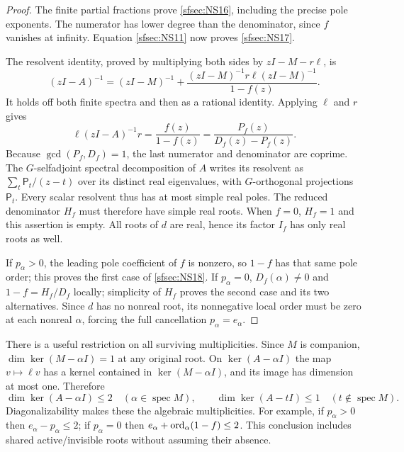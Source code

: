\begin{proof}
The finite partial fractions prove \eqref{sfsec:NS16}, including
the precise pole exponents. The numerator has lower degree
than the denominator, since $f$ vanishes at infinity.
Equation \eqref{sfsec:NS11} now proves \eqref{sfsec:NS17}.

The resolvent identity, proved by multiplying both sides
by $zI-M-r\ell$, is
\begin{equation}\tag{NS19}\label{sfsec:NS19}
(zI-A)^{-1}
=(zI-M)^{-1}
 +\frac{(zI-M)^{-1}r\ell(zI-M)^{-1}}{1-f(z)}.
\end{equation}
It holds off both finite spectra and then as a rational
identity. Applying $\ell$ and $r$ gives
\[
\ell(zI-A)^{-1}r=\frac{f(z)}{1-f(z)}
                 =\frac{P_f(z)}{D_f(z)-P_f(z)}.
\]
Because $\gcd(P_f,D_f)=1$, the last numerator and
denominator are coprime. The $G$-selfadjoint spectral
decomposition of $A$ writes its resolvent as
$\sum_t\mathsf P_t/(z-t)$ over its distinct real
eigenvalues, with $G$-orthogonal projections $\mathsf P_t$.
Every scalar resolvent thus has at most simple real poles.
The reduced denominator $H_f$ must therefore have simple
real roots. When $f=0$, $H_f=1$ and this assertion is empty.
All roots of $d$ are real, hence its factor $I_f$ has
only real roots as well.

If $p_\alpha>0$, the leading pole coefficient of $f$
is nonzero, so $1-f$ has that same pole order; this proves
the first case of \eqref{sfsec:NS18}. If $p_\alpha=0$,
$D_f(\alpha)\ne0$ and $1-f=H_f/D_f$ locally; simplicity
of $H_f$ proves the second case and its two alternatives.
Since $d$ has no nonreal root, its nonnegative local
order must be zero at each nonreal $\alpha$, forcing
the full cancellation $p_\alpha=e_\alpha$.
\end{proof}

There is a useful restriction on all surviving multiplicities.
Since $M$ is companion, $\dim\ker(M-\alpha I)=1$ at any
original root. On $\ker(A-\alpha I)$ the map $v\mapsto\ell v$
has a kernel contained in $\ker(M-\alpha I)$, and its image
has dimension at most one. Therefore
\begin{equation}\tag{NS20}\label{sfsec:NS20}
\dim\ker(A-\alpha I)\leq2
\quad(\alpha\in\operatorname{spec}M),\qquad
\dim\ker(A-tI)\leq1
\quad(t\notin\operatorname{spec}M).
\end{equation}
Diagonalizability makes these the algebraic multiplicities.
For example, if $p_\alpha>0$ then $e_\alpha-p_\alpha\leq2$;
if $p_\alpha=0$ then
$e_\alpha+\operatorname{ord}_\alpha(1-f)\leq2$.
This conclusion includes shared active/invisible roots
without assuming their absence.


